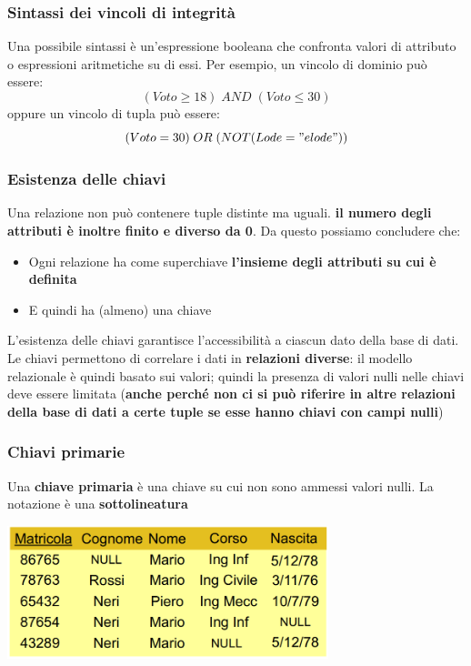 \documentclass[12pt]{article}
\begin{document}
\subsubsection{Sintassi dei vincoli di integrità}
Una possibile sintassi è un'espressione booleana che confronta valori di attributo o espressioni aritmetiche su di essi.
Per esempio, un vincolo di dominio può essere:
$$(Voto \geq 18) \; AND \; (Voto \leq 30)$$
oppure un vincolo di tupla può essere:
$$(Voto = 30) \; OR \; (NOT (Lode = "e lode"))$$
\subsubsection{Esistenza delle chiavi}
Una relazione non può contenere tuple distinte ma uguali.
\textbf{il numero degli attributi è inoltre finito e diverso da 0}.
Da questo possiamo concludere che:
\begin{itemize}
    \item Ogni relazione ha come superchiave \textbf{l'insieme degli attributi su cui è definita}
    \item E quindi ha (almeno) una chiave
\end{itemize}
L'esistenza delle chiavi garantisce l'accessibilità a ciascun dato della base di dati.
Le chiavi permettono di correlare i dati in \textbf{relazioni diverse}: il modello relazionale è quindi basato sui valori; quindi la presenza di valori nulli nelle chiavi deve essere limitata (\textbf{anche perché non ci si può riferire in altre relazioni della base di dati a certe tuple se esse hanno chiavi con campi nulli})
\newpage
\subsubsection{Chiavi primarie}
Una \textbf{chiave primaria} è una chiave su cui non sono ammessi valori nulli.
La notazione è una \textbf{sottolineatura}
\begin{center}
    \includegraphics[width = 0.70\textwidth]{Images/82.PNG}
\end{center}
\end{document}
